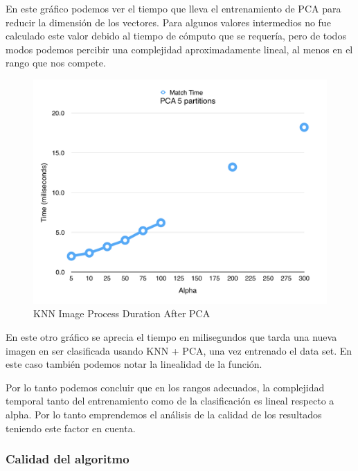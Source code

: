 En este gráfico podemos ver el tiempo que lleva el entrenamiento de PCA para reducir la dimensión de los vectores. Para algunos valores intermedios no fue calculado este valor debido al tiempo de cómputo que se requería, pero de todos modos podemos percibir una complejidad aproximadamente lineal, al menos en el rango que nos compete.

\newpage
\begin{figure}[h!]
  \begin{center}
	\includegraphics[scale=0.7]{exp2/PCA-Match-Time.png}
	\caption{KNN Image Process Duration After PCA}
  \end{center}
\end{figure}

En este otro gráfico se aprecia el tiempo en milisegundos que tarda una nueva imagen en ser clasificada usando KNN + PCA, una vez entrenado el data set. En este caso también podemos notar la linealidad de la función.

Por lo tanto podemos concluir que en los rangos adecuados, la complejidad temporal tanto del entrenamiento como de la clasificación es lineal respecto a alpha. Por lo tanto emprendemos el análisis de la calidad de los resultados teniendo este factor en cuenta.

\subsubsection*{Calidad del algoritmo}

